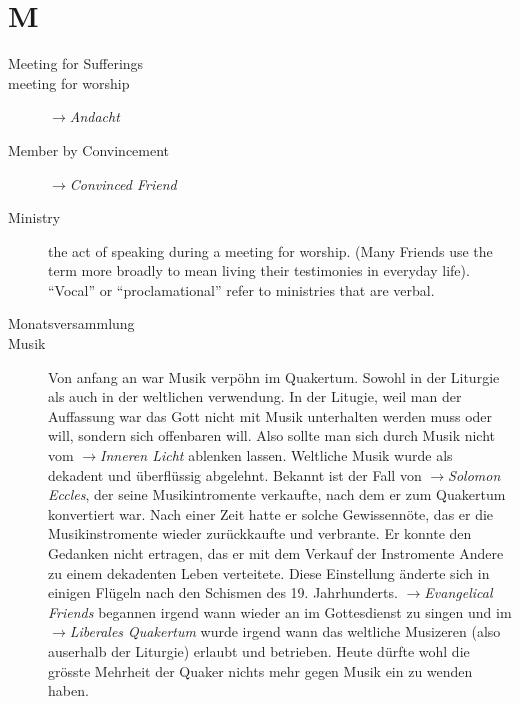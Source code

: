 \section*{M}

\articlesize

\begin{description}

 \item[Meeting for Sufferings]
 
 \item[meeting for worship]  $\to$\textit{Andacht}

 \item[Member by Convincement] $\to$\textit{Convinced Friend}
 
 \item[Ministry]
    the act of speaking during a meeting for worship. (Many Friends use the term more broadly to mean living their testimonies in everyday life). "`Vocal"' or "`proclamational"' refer to ministries that are verbal.
 
 \item[Monatsversammlung]
 
 \item[Musik] Von anfang an war Musik verpöhn im Quakertum. Sowohl in der Liturgie
 als auch in der weltlichen verwendung. In der Litugie, weil man der Auffassung war
 das Gott nicht mit Musik unterhalten werden muss oder will, sondern sich offenbaren
 will. Also sollte man sich durch Musik nicht vom $\to$\textit{Inneren Licht}
 ablenken lassen. Weltliche Musik wurde als dekadent und überflüssig abgelehnt.
 Bekannt ist der Fall von $\to$\textit{Solomon Eccles}, der seine Musikintromente
 verkaufte, nach dem er zum Quakertum konvertiert war. Nach einer Zeit hatte er
 solche Gewissennöte, das er die Musikinstromente wieder zurückkaufte und
 verbrante. Er konnte den Gedanken nicht ertragen, das er mit dem Verkauf der
 Instromente Andere zu einem dekadenten Leben verteitete. Diese Einstellung
 änderte sich in einigen Flügeln nach den Schismen des 19. Jahrhunderts.
 $\to$\textit{Evangelical Friends} begannen irgend wann wieder an im
 Gottesdienst zu singen und im $\to$\textit{Liberales Quakertum} wurde irgend
 wann das weltliche Musizeren (also auserhalb der Liturgie) erlaubt und
 betrieben. Heute dürfte wohl die grösste Mehrheit der Quaker nichts mehr
 gegen Musik ein zu wenden haben.

 \end{description}

\normalsize
